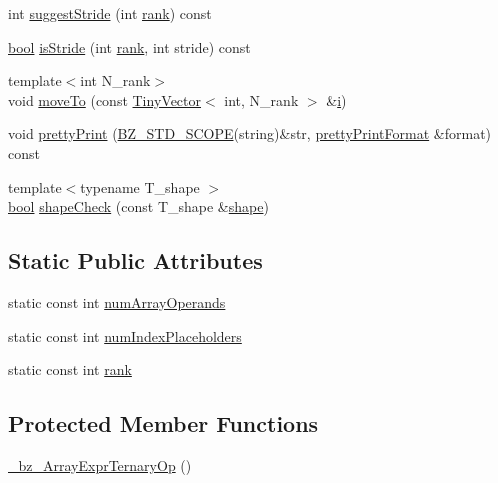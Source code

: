 \begin{DoxyCompactItemize}
\item 
int \hyperlink{class__bz__ArrayExprTernaryOp_a1b34e7346f88eda0d9162057179f007f}{suggest\+Stride} (int \hyperlink{class__bz__ArrayExprTernaryOp_afdb88cf98214c518580dcbc5ee7ad256}{rank}) const 
\item 
\hyperlink{compiler_8h_abb452686968e48b67397da5f97445f5b}{bool} \hyperlink{class__bz__ArrayExprTernaryOp_aae9b4cdae93215b11990d183f3a32359}{is\+Stride} (int \hyperlink{class__bz__ArrayExprTernaryOp_afdb88cf98214c518580dcbc5ee7ad256}{rank}, int stride) const 
\item 
{\footnotesize template$<$int N\+\_\+rank$>$ }\\void \hyperlink{class__bz__ArrayExprTernaryOp_adb1ec0ce75bd213de8aa02de958addef}{move\+To} (const \hyperlink{classTinyVector}{Tiny\+Vector}$<$ int, N\+\_\+rank $>$ \&\hyperlink{indexexpr_8h_aabd77643995707c185e95c8cb2782c81}{i})
\item 
void \hyperlink{class__bz__ArrayExprTernaryOp_ac655a36bd7b4ede3d48f57417540bfad}{pretty\+Print} (\hyperlink{numinquire_8h_a2b24ffc3b4ef9803956bc7715c6c7b83}{B\+Z\+\_\+\+S\+T\+D\+\_\+\+S\+C\+O\+P\+E}(string)\&str, \hyperlink{classprettyPrintFormat}{pretty\+Print\+Format} \&format) const 
\item 
{\footnotesize template$<$typename T\+\_\+shape $>$ }\\\hyperlink{compiler_8h_abb452686968e48b67397da5f97445f5b}{bool} \hyperlink{class__bz__ArrayExprTernaryOp_a5886658fb5011ca42d87d49deeeb8d5e}{shape\+Check} (const T\+\_\+shape \&\hyperlink{shape_8h_a9d9da3dcaecbbde6cf1961063f2e838b}{shape})
\end{DoxyCompactItemize}
\subsection*{Static Public Attributes}
\begin{DoxyCompactItemize}
\item 
static const int \hyperlink{class__bz__ArrayExprTernaryOp_ab0747b722ffa00c636081d47f5f864c0}{num\+Array\+Operands}
\item 
static const int \hyperlink{class__bz__ArrayExprTernaryOp_ae5cd34fbff7229b400350e5f4db0e81b}{num\+Index\+Placeholders}
\item 
static const int \hyperlink{class__bz__ArrayExprTernaryOp_afdb88cf98214c518580dcbc5ee7ad256}{rank}
\end{DoxyCompactItemize}
\subsection*{Protected Member Functions}
\begin{DoxyCompactItemize}
\item 
\hyperlink{class__bz__ArrayExprTernaryOp_af48030e8188db677c9b7005e5ac8e241}{\+\_\+bz\+\_\+\+Array\+Expr\+Ternary\+Op} ()
\end{DoxyCompactItemize}
